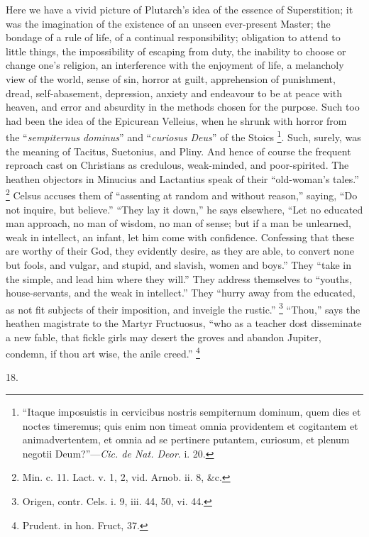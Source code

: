 Here we have a vivid picture of Plutarch's idea of the
essence of Superstition; it was the imagination of the
existence of an unseen ever-present Master; the bondage
of a rule of life, of a continual responsibility;
obligation to attend to little things, the impossibility
of escaping from duty, the inability to choose or change
one's religion, an interference with the enjoyment of
life, a melancholy view of the world, sense of sin,
horror at guilt, apprehension of punishment, dread,
self-abasement, depression, anxiety and endeavour to be
at peace with heaven, and error and absurdity in the
methods chosen for the purpose. Such too had been the
idea of the Epicurean Velleius, when he shrunk with
horror from the ``\emph{sempiternus dominus}''
and ``\emph{curiosus Deus}'' of the Stoics \footnote{``Itaque imposuistis in
cervicibus nostris sempiternum dominum, quem dies et
noctes timeremus; quis enim non timeat omnia providentem
et cogitantem et animadvertentem, et omnia ad se
pertinere putantem, curiosum, et plenum negotii
Deum?''—\emph{Cic. de Nat. Deor}. i. 20.}. Such,
surely, was the meaning of Tacitus, Suetonius, and Pliny.
And hence of course the frequent reproach cast on
Christians as credulous, weak-minded, and poor-spirited.
The heathen objectors in Minucius and Lactantius speak of
their ``old-woman's tales.'' \footnote{Min. c. 11. Lact. v. 1, 2,
vid. Arnob. ii. 8, \&c.} Celsus accuses them of
``assenting at random and without reason,''
saying, ``Do not inquire, but believe.''
``They lay it down,'' he says elsewhere,
``Let no educated man approach, no man of wisdom, no
man of sense; but if a man be unlearned, weak in
intellect, an infant, let him come with confidence.
Confessing that these are worthy of their God, they
evidently desire, as they are able, to convert none but
fools, and vulgar, and stupid, and slavish, women and
boys.'' They ``take in the simple, and lead him
where they will.'' They address themselves to
``youths, house-servants, and the weak in
intellect.'' They ``hurry away from the educated,
as not fit subjects of their imposition, and inveigle the
rustic.'' \footnote{Origen, contr. Cels. i. 9,
iii. 44, 50, vi. 44.} ``Thou,'' says the heathen magistrate to
the Martyr Fructuosus, ``who as a teacher dost
disseminate a new fable, that fickle girls may desert the
groves and abandon Jupiter, condemn, if thou art wise,
the anile creed.'' \footnote{Prudent. in hon. Fruct, 37.}

18.

